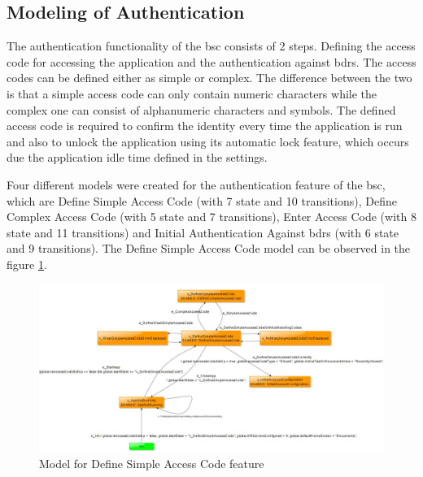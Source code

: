 \subsection{Modeling of Authentication}
\par
The authentication functionality of the \acrshort{bsc} consists of 2 steps. Defining the access code for accessing the application and the authentication against \acrshort{bdrs}. The access codes can be defined either as simple or complex. The difference between the two is that a simple access code can only contain numeric characters while the complex one can consist of alphanumeric characters and symbols. The defined access code is required to confirm the identity every time the application is run and also to unlock the application using its automatic lock feature, which occurs due the application idle time defined in the settings.

\par
Four different models were created for the authentication feature of the \acrshort{bsc}, which are Define Simple Access Code (with 7 state and 10 transitions), Define Complex Access Code (with 5 state and 7 transitions), Enter Access Code (with 8 state and 11 transitions) and Initial Authentication Against \acrshort{bdrs} (with 6 state and 9 transitions). The Define Simple Access Code model can be observed in the figure \ref{Fig:Authentication_Model_Screenshot}.

\begin{figure} [htbp!]
	\centering
					\includegraphics[width=1\textwidth]{figures/Authentication_model_screenshot}
					\caption{\label{Fig:Authentication_Model_Screenshot} Model for Define Simple Access Code feature}
\end{figure}

